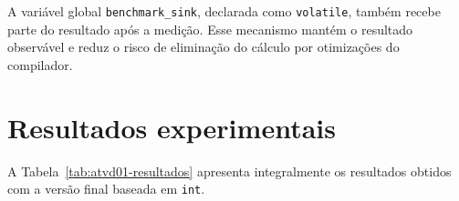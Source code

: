 A variável global \texttt{benchmark\_sink}, declarada como
\texttt{volatile}, também recebe parte do resultado após a medição. Esse
mecanismo mantém o resultado observável e reduz o risco de eliminação do
cálculo por otimizações do compilador.



\section{Resultados experimentais}

\label{sec:atvd01-resultados}

A Tabela~\ref{tab:atvd01-resultados} apresenta integralmente os resultados
obtidos com a versão final baseada em \texttt{int}.

\small

